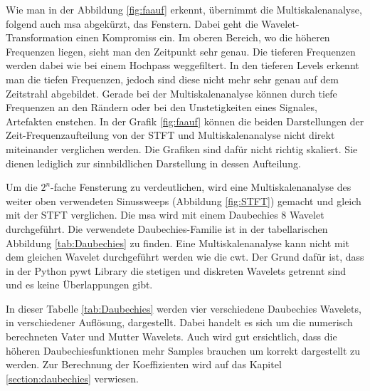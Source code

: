 Wie man in der Abbildung \ref{fig:faauf} erkennt, übernimmt die Multiskalenanalyse, folgend auch msa abgekürzt, das Fenstern. Dabei geht die Wavelet-Transformation einen Kompromiss ein. Im oberen Bereich, wo die höheren Frequenzen liegen, sieht man den Zeitpunkt sehr genau. Die tieferen Frequenzen werden dabei wie bei einem Hochpass weggefiltert. In den tieferen Levels erkennt man die tiefen Frequenzen, jedoch sind diese nicht mehr sehr genau auf dem Zeitstrahl abgebildet. Gerade bei der Multiskalenanalyse können durch tiefe Frequenzen an den Rändern oder bei den Unstetigkeiten eines Signales, Artefakten enstehen. In der Grafik \ref{fig:faauf} können die beiden Darstellungen der Zeit-Frequenzaufteilung von der STFT und Multiskalenanalyse nicht direkt miteinander verglichen werden. Die Grafiken sind dafür nicht richtig skaliert. Sie dienen lediglich zur sinnbildlichen Darstellung in dessen Aufteilung.

Um die $2^{n}$-fache Fensterung zu verdeutlichen, wird eine  Multiskalenanalyse des weiter oben verwendeten Sinussweeps (Abbildung \ref{fig:STFT}) gemacht und gleich mit der STFT verglichen.
Die msa wird mit einem Daubechies 8 Wavelet durchgeführt. Die verwendete Daubechies-Familie ist in der tabellarischen Abbildung \ref{tab:Daubechies} zu finden. Eine Multiskalenanalyse kann nicht mit dem gleichen Wavelet durchgeführt werden wie die cwt. Der Grund dafür ist, dass in der Python pywt Library die stetigen und diskreten Wavelets getrennt sind und es keine Überlappungen gibt.

In dieser Tabelle \ref{tab:Daubechies} werden vier verschiedene Daubechies Wavelets, in verschiedener Auflösung, dargestellt. Dabei handelt es sich um die numerisch berechneten Vater und Mutter Wavelets. Auch wird gut ersichtlich, dass die höheren Daubechiesfunktionen mehr Samples brauchen um korrekt dargestellt zu werden. Zur Berechnung der Koeffizienten wird auf das Kapitel \ref{section:daubechies} verwiesen.\\


